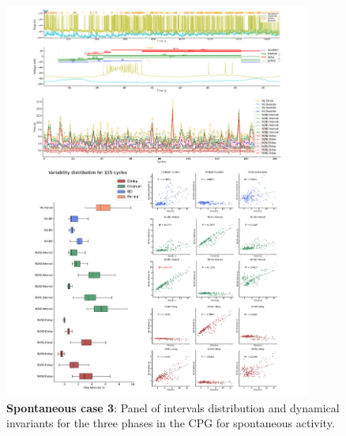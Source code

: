 \begin{figure}[htbp]
	\centering
	\includegraphics[width=0.9\textwidth]{./invariants/data/SUSSEX/prep1/images/3phases/panel_with_intervals.pdf}
	\caption{\textbf{Spontaneous case 3}: Panel of intervals distribution and dynamical invariants for the three phases in the CPG for spontaneous activity.}
	\label{fig:prep1 invariants}
\end{figure}


